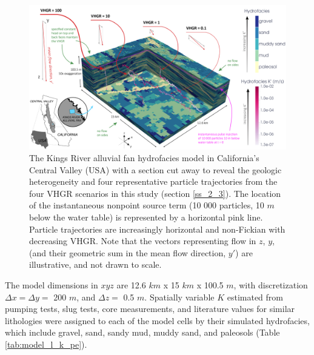 \begin{figure}[ht]
\centering
  \includegraphics[width=\textwidth]{ch4_figs/krf_part_traj_00_03-01.png}
  \caption{The Kings River alluvial fan hydrofacies model in California's Central Valley (USA) with a section cut away to reveal the geologic heterogeneity and four representative particle trajectories from the four VHGR scenarios in this study (section \ref{ss_2_3}). The location of the instantaneous nonpoint source term (10 000 particles, 10 $m$ below the water table) is represented by a horizontal pink line. Particle trajectories are increasingly horizontal and non-Fickian with decreasing VHGR. Note that the vectors representing flow in $z$, $y$, (and their geometric sum in the mean flow direction, $y'$) are illustrative, and not drawn to scale.}
  \label{fig:model}
\end{figure}


The model dimensions in $xyz$ are 12.6 $km$ x 15 $km$ x 100.5 $m$, with discretization $\Delta x = \Delta y = $ 200 $m$, and $\Delta z =$ 0.5 $m$. Spatially variable $K$ estimated from pumping tests, slug tests, core measurements, and literature values for similar lithologies \citep{burow1999evaluation, weissmann1999three} were assigned to each of the model cells by their simulated hydrofacies, which include gravel, sand, sandy mud, muddy sand, and paleosols (Table \ref{tab:model_l_k_pe}).


